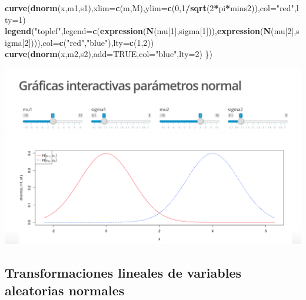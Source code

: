 \documentclass[]{book}
\newenvironment{Shaded}{\begin{snugshade}}{\end{snugshade}}
\newcommand{\DataTypeTok}[1]{\textcolor[rgb]{0.13,0.29,0.53}{#1}}
\newcommand{\DecValTok}[1]{\textcolor[rgb]{0.00,0.00,0.81}{#1}}
\newcommand{\KeywordTok}[1]{\textcolor[rgb]{0.13,0.29,0.53}{\textbf{#1}}}
\newcommand{\NormalTok}[1]{#1}
\newcommand{\OperatorTok}[1]{\textcolor[rgb]{0.81,0.36,0.00}{\textbf{#1}}}
\newcommand{\OtherTok}[1]{\textcolor[rgb]{0.56,0.35,0.01}{#1}}
\newcommand{\StringTok}[1]{\textcolor[rgb]{0.31,0.60,0.02}{#1}}
\begin{document}
\begin{Shaded}
\begin{Highlighting}[]
\KeywordTok{curve}\NormalTok{(}\KeywordTok{dnorm}\NormalTok{(x,m1,s1),}\DataTypeTok{xlim=}\KeywordTok{c}\NormalTok{(m,M),}\DataTypeTok{ylim=}\KeywordTok{c}\NormalTok{(}\DecValTok{0}\NormalTok{,}\DecValTok{1}\OperatorTok{/}\KeywordTok{sqrt}\NormalTok{(}\DecValTok{2}\OperatorTok{*}\NormalTok{pi}\OperatorTok{*}\NormalTok{mins2)),}\DataTypeTok{col=}\StringTok{"red"}\NormalTok{,}\DataTypeTok{lty=}\DecValTok{1}\NormalTok{)}
\KeywordTok{legend}\NormalTok{(}\StringTok{"toplef"}\NormalTok{,}\DataTypeTok{legend=}\KeywordTok{c}\NormalTok{(}\KeywordTok{expression}\NormalTok{(}\KeywordTok{N}\NormalTok{(mu[}\DecValTok{1}\NormalTok{],sigma[}\DecValTok{1}\NormalTok{])),}\KeywordTok{expression}\NormalTok{(}\KeywordTok{N}\NormalTok{(mu[}\DecValTok{2}\NormalTok{],sigma[}\DecValTok{2}\NormalTok{]))),}\DataTypeTok{col=}\KeywordTok{c}\NormalTok{(}\StringTok{"red"}\NormalTok{,}\StringTok{"blue"}\NormalTok{),}\DataTypeTok{lty=}\KeywordTok{c}\NormalTok{(}\DecValTok{1}\NormalTok{,}\DecValTok{2}\NormalTok{))}
\KeywordTok{curve}\NormalTok{(}\KeywordTok{dnorm}\NormalTok{(x,m2,s2),}\DataTypeTok{add=}\OtherTok{TRUE}\NormalTok{,}\DataTypeTok{col=}\StringTok{"blue"}\NormalTok{,}\DataTypeTok{lty=}\DecValTok{2}\NormalTok{)}
\NormalTok{\})}
\end{Highlighting}
\end{Shaded}

\href{https://github.com/joanby/probabilidad}{\includegraphics{Images/noshinyImages/interactiva_normal1.png}}

\hypertarget{transformaciones-lineales-de-variables-aleatorias-normales}{%
\subsection{Transformaciones lineales de variables aleatorias normales}\label{transformaciones-lineales-de-variables-aleatorias-normales}}
\end{document}
